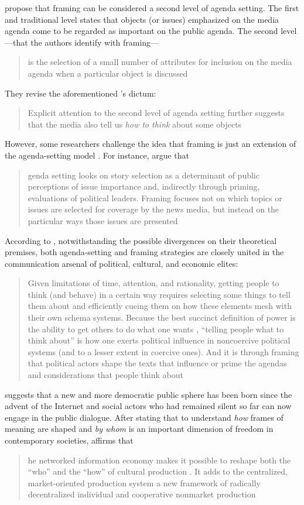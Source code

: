 \citeauthor{mccombs1997candidate} propose that framing can be considered a second level of agenda setting. The first and traditional level states that objects (or issues) emphasized on the media agenda come to be regarded as important on the public agenda. The second level---that the authors identify with framing---\blockcquote{mccombs1997candidate}[.]{is the selection of a small number of attributes for inclusion on the media agenda when a particular object is discussed} They revise the aforementioned \citeauthor{cohen1965press}'s dictum: \blockcquote{mccombs1997candidate}[.]{Explicit attention to the second level of agenda setting further suggests that the media also tell us \emph{how to think} about some objects}

However, some researchers challenge the idea that framing is just an extension of the agenda-setting model \autocite{price1997news,scheufele2007framing}. For instance, \citeauthor{price1997news} argue that \blockcquote[184]{price1997news}[.]{genda setting looks on story selection as a determinant of public perceptions of issue importance and, indirectly through priming, evaluations of political leaders. Framing focuses not on which topics or issues are selected for coverage by the news media, but instead on the particular ways those issues are presented}

According to \citeauthor{entman2007framing}, notwithstanding the possible divergences on their theoretical premises, both agenda-setting and framing strategies are closely united in the communication arsenal of political, cultural, and economic elites: \blockcquote{entman2007framing}[.]{Given limitations of time, attention, and rationality, getting people to think (and behave) in a certain way requires selecting some things to tell them about and efficiently cueing them on how these elements mesh with their own schema systems. Because the best succinct definition of power is the ability to get others to do what one wants \autocite{nagel1975power}, \enquote{telling people what to think about}  is how one exerts political influence in noncoercive political systems (and to a lesser extent in coercive ones). And it is through framing that political actors shape the texts that influence or prime the agendas and considerations that people think about}

\citeauthor{benkler2006wealth} suggests that a new and more democratic public sphere has been born since the advent of the Internet and social actors who had remained silent so far can now engage in the public dialogue. After stating that to understand \emph{how} frames of meaning are shaped and \emph{by whom} is an important dimension of freedom in contemporary societies, \citeauthor{benkler2006wealth} affirms that \blockcquote[275]{benkler2006wealth}[.]{he networked information economy makes it possible to reshape both the \enquote{who} and the \enquote{how} of cultural production \textelp{}. It adds to the centralized, market-oriented production system a new framework of radically decentralized individual and cooperative nonmarket production}

